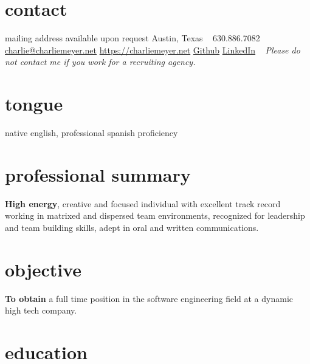 \documentclass{friggeri-cv} %
\begin{document}


\begin{aside} %
\section{contact}
mailing address available upon request
Austin, Texas
~
630.886.7082
~
\href{mailto:charlie@charliemeyer.net}{charlie@charliemeyer.net}
\href{https://charliemeyer.net}{https://charliemeyer.net}
\href{https://www.github.com/cemeyer2}{Github}
\href{www.linkedin.com/in/cemeyer2}{LinkedIn}
~
\emph{Please do not contact me if you work for a recruiting agency.}
\section{tongue}
native english,
professional spanish proficiency
\end{aside}

\section{professional summary}

\textbf{High energy}, creative and focused individual with excellent track record working in matrixed and dispersed team environments, recognized for leadership and team building skills, adept in oral and written communications.

\section{objective}

\textbf{To obtain} a full time position in the software engineering field at a dynamic high tech company.


\section{education}
\end{document}
